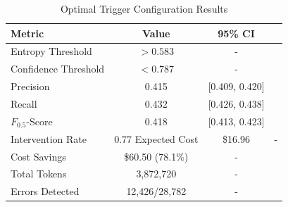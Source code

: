 \begin{table}[h]
\centering
\caption{Optimal Trigger Configuration Results}
\label{tab:optimization_results}
\begin{tabular}{lcc}
\toprule
\textbf{Metric} & \textbf{Value} & \textbf{95\% CI} \\
\midrule
Entropy Threshold & $> 0.583$ & - \\
Confidence Threshold & $< 0.787$ & - \\
\midrule
Precision & 0.415 & [0.409, 0.420] \\
Recall & 0.432 & [0.426, 0.438] \\
$F_{0.5}$-Score & 0.418 & [0.413, 0.423] \\
\midrule
Intervention Rate & 0.77%
Expected Cost & \$16.96 & - \\
Cost Savings & \$60.50 (78.1\%) & - \\
\midrule
Total Tokens & 3,872,720 & - \\
Errors Detected & 12,426/28,782 & - \\
\bottomrule
\end{tabular}
\end{table}